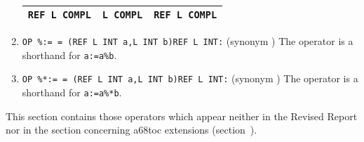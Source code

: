 \begin{enumerate}
\begin{tabular}{|l|l||l|}
  \texttt{REF L COMPL} &\texttt{L COMPL}   &\texttt{REF L COMPL}\\ \hline
\end{tabular} \newline
\item \verb|OP %:= = (REF L INT a,L INT b)REF L INT:|\newline
(synonym )\newline
The operator is a shorthand for \verb|a:=a%b|.
\item \verb|OP %*:= = (REF L INT a,L INT b)REF L INT:|\newline
(synonym )\newline
The operator is a shorthand for \verb|a:=a%*b|.
\end{enumerate}

This section contains those operators which appear neither in the
Revised Report nor in the section concerning a68toc extensions
(section~).
